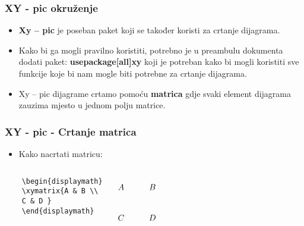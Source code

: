 \documentclass[9pt]{beamer}
\begin{document}
\begin{frame}
\frametitle{XY - pic okruženje}

\begin{itemize}
	\item \textbf{Xy – pic} je poseban paket koji se također koristi za crtanje dijagrama.
	\item Kako bi ga mogli pravilno koristiti, potrebno je u preambulu dokumenta dodati paket: 	\textbf{usepackage[all]{xy}}
	koji je potreban kako bi mogli koristiti sve funkcije koje bi nam mogle biti  potrebne za crtanje dijagrama.
	
	\item Xy – pic dijagrame crtamo pomoću \textbf{matrica} gdje svaki element dijagrama zauzima mjesto u jednom polju matrice.
\end{itemize}
\end{frame}

\begin{frame}[fragile]
\frametitle{XY - pic - Crtanje matrica}

\begin{itemize}
	\item Kako nacrtati matricu: 
\end{itemize}

\begin{columns}
	\begin{verbatim}
	\begin{displaymath}
	\xymatrix{A & B \\
	C & D }
	\end{displaymath} 
	\end{verbatim}
	
	\begin{displaymath}
	\xymatrix{A & B \\
		C & D }
	\end{displaymath}
\end{columns}


\end{frame}
\end{document}
